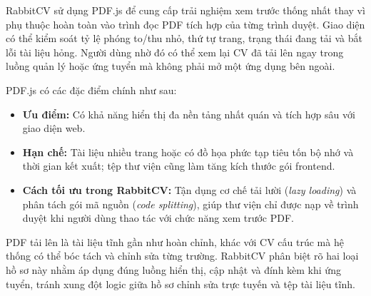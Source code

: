 RabbitCV sử dụng PDF.js để cung cấp trải nghiệm xem trước thống nhất thay vì phụ thuộc hoàn toàn vào trình đọc PDF tích hợp của từng trình duyệt. Giao diện có thể kiểm soát tỷ lệ phóng to/thu nhỏ, thứ tự trang, trạng thái đang tải và bắt lỗi tài liệu hỏng. Người dùng nhờ đó có thể xem lại CV đã tải lên ngay trong luồng quản lý hoặc ứng tuyển mà không phải mở một ứng dụng bên ngoài.

PDF.js có các đặc điểm chính như sau:

\begin{itemize}
    \item \textbf{Ưu điểm:} Có khả năng hiển thị đa nền tảng nhất quán và tích hợp sâu với giao diện web.
    \item \textbf{Hạn chế:} Tài liệu nhiều trang hoặc có đồ họa phức tạp tiêu tốn bộ nhớ và thời gian kết xuất; tệp thư viện cũng làm tăng kích thước gói frontend.
    \item \textbf{Cách tối ưu trong RabbitCV:} Tận dụng cơ chế tải lười (\textit{lazy loading}) và phân tách gói mã nguồn (\textit{code splitting}), giúp thư viện chỉ được nạp về trình duyệt khi người dùng thao tác với chức năng xem trước PDF.
\end{itemize}

PDF tải lên là tài liệu tĩnh gần như hoàn chỉnh, khác với CV cấu trúc mà hệ thống có thể bóc tách và chỉnh sửa từng trường. RabbitCV phân biệt rõ hai loại hồ sơ này nhằm áp dụng đúng luồng hiển thị, cập nhật và đính kèm khi ứng tuyển, tránh xung đột logic giữa hồ sơ chỉnh sửa trực tuyến và tệp tài liệu tĩnh.




